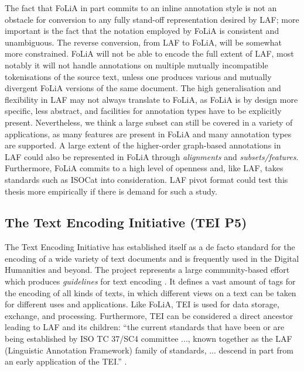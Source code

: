 \documentclass[a4paper,10pt,twoside]{article}
\begin{document}
The fact that FoLiA in part commits to an inline annotation style is not an
obstacle for conversion to any fully stand-off representation desired by LAF;
more important is the fact that the notation employed by FoLiA is consistent
and unambiguous. The reverse conversion, from LAF to FoLiA, will be somewhat
more constrained. FoLiA will not be able to encode the full extent of LAF, most
notably it will not handle annotations on multiple mutually incompatible
tokenisations of the source text, unless one produces various and mutually
divergent FoLiA versions of the same document. The high generalisation and
flexibility in LAF may not always translate to FoLiA, as FoLiA is by design
more specific, less abstract, and facilities for annotation types have to be
explicitly present. Nevertheless, we think a large subset can still be covered
in a variety of applications, as many features are present in FoLiA and many
annotation types are supported. A large extent of the higher-order graph-based
annotations in LAF could also be represented in FoLiA through \emph{alignments}
and \emph{subsets/features}. Furthermore, FoLiA commits to a high level of
openness and, like LAF, takes standards such as ISOCat \cite{ISOCAT} into
consideration. %
LAF pivot format could test this thesis more empirically if there is demand for
such a study. %


\subsection{The Text Encoding Initiative (TEI P5)}

The Text Encoding Initiative has established itself as a de facto standard for
the encoding of a wide variety of text documents and is frequently used in the
Digital Humanities and beyond. The project represents a large community-based
effort which produces \emph{guidelines} for text encoding \cite{TEI}. It
defines a vast amount of tags for the encoding of all kinds of texts, in which
different views on a text can be taken for different uses and applications.
Like FoLiA, TEI is used for data storage, exchange, and processing.
Furthermore, TEI can be considered a direct ancestor leading to LAF and its
children: ``the current standards that have been or are being established by ISO
TC 37/SC4 committee ..., known together as the LAF (Linguistic Annotation Framework) family of standards, ... descend
in part from an early application of the TEI.'' \cite{TEICORPUSANNOT}. 
\end{document}
